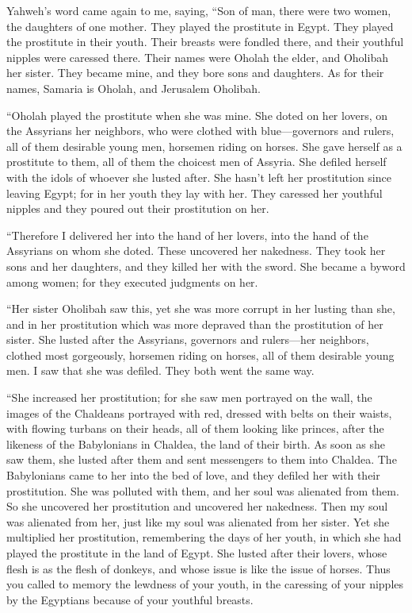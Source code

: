  Yahweh's word came again to me, saying, 
``Son of man, there were two women, the daughters of one mother.
 They played the prostitute in Egypt. They played the
prostitute in their youth. Their breasts were fondled there, and their
youthful nipples were caressed there.  Their names were
Oholah the elder, and Oholibah her sister. They became mine, and they
bore sons and daughters. As for their names, Samaria is Oholah, and
Jerusalem Oholibah.

 ``Oholah played the prostitute when she was mine. She
doted on her lovers, on the Assyrians her neighbors,  who
were clothed with blue---governors and rulers, all of them desirable
young men, horsemen riding on horses.  She gave herself as
a prostitute to them, all of them the choicest men of Assyria. She
defiled herself with the idols of whoever she lusted after.
 She hasn't left her prostitution since leaving Egypt; for
in her youth they lay with her. They caressed her youthful nipples and
they poured out their prostitution on her.

 ``Therefore I delivered her into the hand of her lovers,
into the hand of the Assyrians on whom she doted.  These
uncovered her nakedness. They took her sons and her daughters, and they
killed her with the sword. She became a byword among women; for they
executed judgments on her.

 ``Her sister Oholibah saw this, yet she was more corrupt
in her lusting than she, and in her prostitution which was more depraved
than the prostitution of her sister.  She lusted after
the Assyrians, governors and rulers---her neighbors, clothed most
gorgeously, horsemen riding on horses, all of them desirable young men.
 I saw that she was defiled. They both went the same way.

 ``She increased her prostitution; for she saw men
portrayed on the wall, the images of the Chaldeans portrayed with red,
 dressed with belts on their waists, with flowing turbans
on their heads, all of them looking like princes, after the likeness of
the Babylonians in Chaldea, the land of their birth.  As
soon as she saw them, she lusted after them and sent messengers to them
into Chaldea.  The Babylonians came to her into the bed
of love, and they defiled her with their prostitution. She was polluted
with them, and her soul was alienated from them.  So she
uncovered her prostitution and uncovered her nakedness. Then my soul was
alienated from her, just like my soul was alienated from her sister.
 Yet she multiplied her prostitution, remembering the
days of her youth, in which she had played the prostitute in the land of
Egypt.  She lusted after their lovers, whose flesh is as
the flesh of donkeys, and whose issue is like the issue of horses.
 Thus you called to memory the lewdness of your youth, in
the caressing of your nipples by the Egyptians because of your youthful
breasts.

